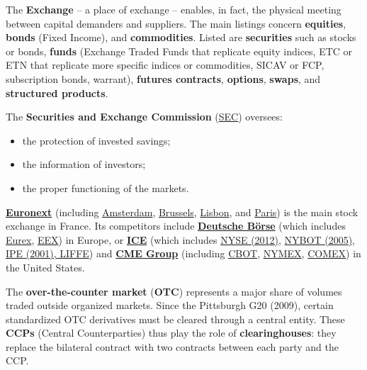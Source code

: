 \def\scaleBS{.95}

\begin{f}
	
The \textbf{Exchange} – a place of exchange – enables, in fact, the physical meeting between capital demanders and suppliers.
The main listings concern \textbf{equities}, \textbf{bonds} (Fixed Income), and \textbf{commodities}.
Listed are \textbf{securities} such as stocks or bonds, \textbf{funds} (Exchange Traded Funds that replicate equity indices, ETC or ETN that replicate more specific indices or commodities, SICAV or FCP, subscription bonds, warrant), \textbf{futures contracts}, \textbf{options}, \textbf{swaps}, and \textbf{structured products}.

The \textbf{Securities and Exchange Commission} (\href{https://www.sec.gov/}{SEC}) oversees:
\begin{itemize}
	\item the protection of invested savings; 
	\item the information of investors; 
	\item the proper functioning of the markets.
\end{itemize}

\textbf{\href{https://www.euronext.com/fr}{Euronext}} (including
\href{https://www.euronext.com/en/markets/amsterdam}{Amsterdam}, 
\href{https://www.euronext.com/en/markets/brussels}{Brussels}, 
\href{https://www.euronext.com/en/markets/lisbon}{Lisbon}, 
and \href{https://www.euronext.com/en/markets/paris}{Paris}) is the main stock exchange in France.
%
Its competitors include \textbf{\href{https://www.deutsche-boerse.com/dbg-en/}{Deutsche Börse}} 
(which includes \href{https://www.eurex.com/}{Eurex}, 
\href{https://www.eex.com/en/}{EEX}) in Europe,
%
or \textbf{\href{https://www.ice.com/}{ICE}} (which includes
\href{https://www.nyse.com/index}{NYSE (2012)}, 
\href{https://www.ice.com/about/history}{NYBOT (2005)}, 
\href{https://www.ice.com/futures-europe}{IPE (2001), LIFFE})
%
and \textbf{\href{https://www.cmegroup.com/}{CME Group}} (including
\href{https://www.cmegroup.com/company/cbot.html}{CBOT}, 
\href{https://www.cmegroup.com/company/nymex.html}{NYMEX}, 
\href{https://www.cmegroup.com/company/comex.html}{COMEX}) in the United States.

The \textbf{over-the-counter market} (\textbf{OTC}) represents a major share of volumes traded outside organized markets.
Since the Pittsburgh G20 (2009), certain standardized OTC derivatives must be cleared through a central entity.
These \textbf{CCPs} (Central Counterparties) thus play the role of \textbf{clearinghouses}: they replace the bilateral contract with two contracts between each party and the CCP.


\end{f}
